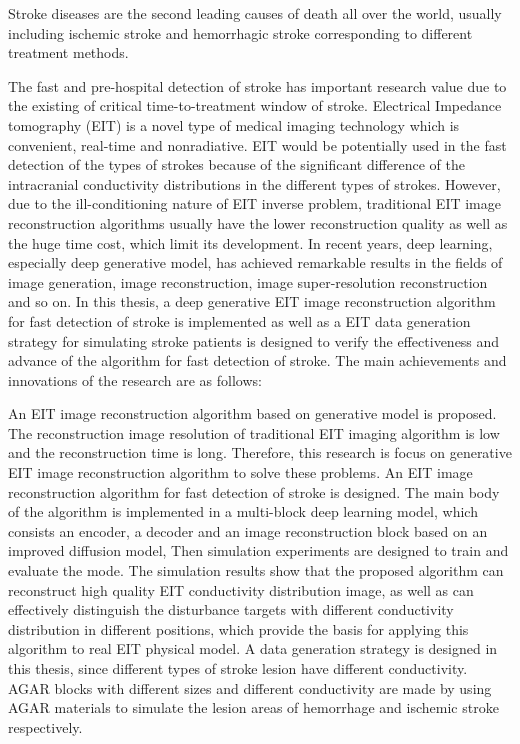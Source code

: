 
\begin{englishabstract}

    Stroke diseases are the second leading causes of death all over the world, 
    usually including ischemic stroke and hemorrhagic stroke corresponding to different treatment methods.
    
    The fast and pre-hospital detection of stroke has important research value due to the existing of critical time-to-treatment window of stroke.  
    Electrical Impedance tomography (EIT) is a novel type of medical imaging technology which is convenient, real-time and nonradiative. 
    EIT would be potentially used in the fast detection of the types of strokes because of the significant difference of the intracranial conductivity distributions in the different types of strokes. 
    However, due to the ill-conditioning nature of EIT inverse problem, traditional EIT image reconstruction algorithms usually have the lower reconstruction quality as well as the huge time cost, which limit its development. 
    In recent years, deep learning, especially deep generative model, has achieved remarkable results in the fields of image generation, image reconstruction, image super-resolution reconstruction and so on. 
    In this thesis, a deep generative EIT image reconstruction algorithm for fast detection of stroke is implemented as well as a EIT data generation strategy for simulating stroke patients is designed to verify the effectiveness and advance of the algorithm for fast detection of stroke.
    The main achievements and innovations of the research are as follows:

    An EIT image reconstruction algorithm based on generative model is proposed. 
    The reconstruction image resolution of traditional EIT imaging algorithm is low and the reconstruction time is long.
    Therefore, this research is focus on generative EIT image reconstruction algorithm to solve these problems.
    An EIT image reconstruction algorithm for fast detection of stroke is designed.
    The main body of the algorithm is implemented in a multi-block deep learning model, which consists an encoder, 
    a decoder and an image reconstruction block based on an improved diffusion model, 
    Then simulation experiments are designed to train and evaluate the mode. 
    The simulation results show that the proposed algorithm can reconstruct high quality EIT conductivity distribution image,
    as well as can effectively distinguish the disturbance targets with different conductivity distribution in different positions,
    which provide the basis for applying this algorithm to real EIT physical model.
    A data generation strategy is designed in this thesis, since different types of stroke lesion have different conductivity.
    AGAR blocks with different sizes and different conductivity are made by using AGAR materials to simulate the lesion areas of hemorrhage and ischemic stroke respectively.


\end{englishabstract}

